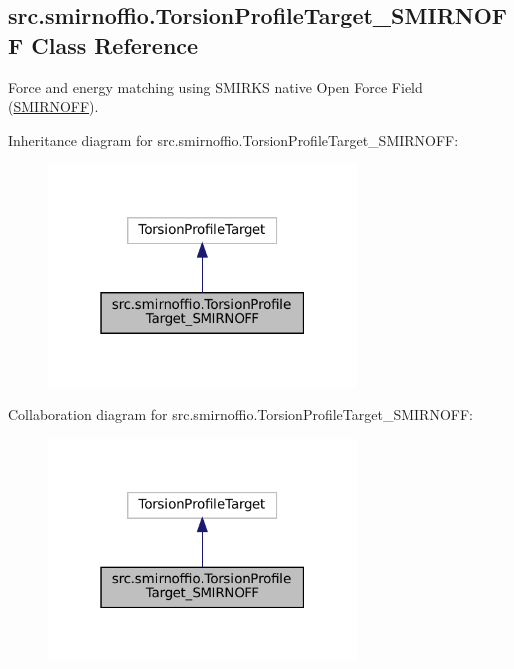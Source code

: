 \hypertarget{classsrc_1_1smirnoffio_1_1TorsionProfileTarget__SMIRNOFF}{}\subsection{src.\+smirnoffio.\+Torsion\+Profile\+Target\+\_\+\+S\+M\+I\+R\+N\+O\+FF Class Reference}
\label{classsrc_1_1smirnoffio_1_1TorsionProfileTarget__SMIRNOFF}


Force and energy matching using S\+M\+I\+R\+KS native Open Force Field (\hyperlink{classsrc_1_1smirnoffio_1_1SMIRNOFF}{S\+M\+I\+R\+N\+O\+FF}).  




Inheritance diagram for src.\+smirnoffio.\+Torsion\+Profile\+Target\+\_\+\+S\+M\+I\+R\+N\+O\+FF\+:
\nopagebreak
\begin{figure}[H]
\begin{center}
\leavevmode
\includegraphics[width=232pt]{classsrc_1_1smirnoffio_1_1TorsionProfileTarget__SMIRNOFF__inherit__graph}
\end{center}
\end{figure}


Collaboration diagram for src.\+smirnoffio.\+Torsion\+Profile\+Target\+\_\+\+S\+M\+I\+R\+N\+O\+FF\+:
\nopagebreak
\begin{figure}[H]
\begin{center}
\leavevmode
\includegraphics[width=232pt]{classsrc_1_1smirnoffio_1_1TorsionProfileTarget__SMIRNOFF__coll__graph}
\end{center}
\end{figure}

